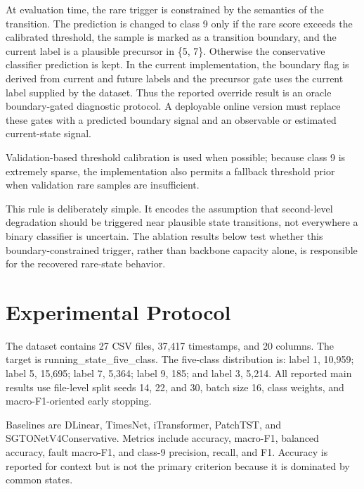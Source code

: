 \documentclass[12pt]{article}
\begin{document}
At evaluation time, the rare trigger is constrained by the semantics of the transition. The prediction is changed to class 9 only if the rare score exceeds the calibrated threshold, the sample is marked as a transition boundary, and the current label is a plausible precursor in \{5, 7\}. Otherwise the conservative classifier prediction is kept. In the current implementation, the boundary flag is derived from current and future labels and the precursor gate uses the current label supplied by the dataset. Thus the reported override result is an oracle boundary-gated diagnostic protocol. A deployable online version must replace these gates with a predicted boundary signal and an observable or estimated current-state signal.

Validation-based threshold calibration is used when possible; because class 9 is extremely sparse, the implementation also permits a fallback threshold prior when validation rare samples are insufficient.

This rule is deliberately simple. It encodes the assumption that second-level degradation should be triggered near plausible state transitions, not everywhere a binary classifier is uncertain. The ablation results below test whether this boundary-constrained trigger, rather than backbone capacity alone, is responsible for the recovered rare-state behavior.

\section{Experimental Protocol}
The dataset contains 27 CSV files, 37,417 timestamps, and 20 columns. The target is running\_state\_five\_class. The five-class distribution is: label 1, 10,959; label 5, 15,695; label 7, 5,364; label 9, 185; and label 3, 5,214. All reported main results use file-level split seeds 14, 22, and 30, batch size 16, class weights, and macro-F1-oriented early stopping.

Baselines are DLinear, TimesNet, iTransformer, PatchTST, and SGTONetV4Conservative. Metrics include accuracy, macro-F1, balanced accuracy, fault macro-F1, and class-9 precision, recall, and F1. Accuracy is reported for context but is not the primary criterion because it is dominated by common states.
\end{document}
